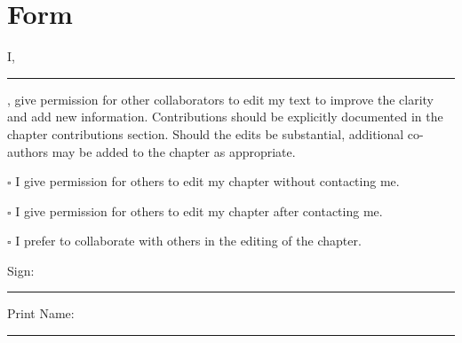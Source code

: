 \documentclass{book}\usepackage{knitr}
\begin{document}
\section*{Form}

I, \rule{3in}{0.4pt}, give permission for other collaborators to edit my text to improve the clarity and add new information. Contributions should be explicitly documented in the chapter contributions section. Should the edits be substantial, additional co-authors may be added to the chapter as appropriate. 

\bigskip

$\square$ I give permission for others to edit my chapter without contacting me.

\medskip

$\square$ I give permission for others to edit my chapter after contacting me.

\medskip

$\square$ I prefer to collaborate with others in the editing of the chapter.

\bigskip

\noindent Sign: \rule{3.4in}{0.4pt}

\bigskip
\noindent Print Name: \rule{3in}{0.4pt}
\end{document}

